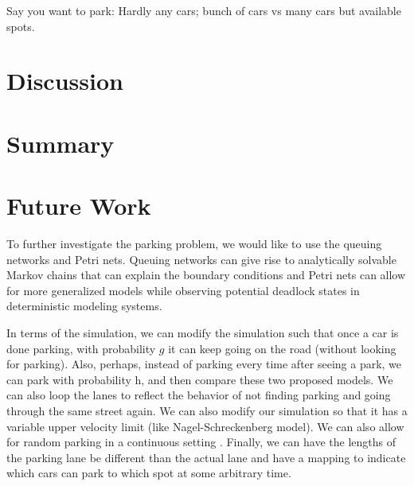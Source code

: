 \documentclass[]{article}
\begin{document}
Say you want to park: Hardly any cars; bunch of cars vs many cars but available spots.

\section*{Discussion}




\section*{Summary}



\section*{Future Work}

To further investigate the parking problem, we would like to use the queuing networks and Petri nets. Queuing networks can give rise to analytically solvable Markov chains that can explain the boundary conditions and Petri nets can allow for more generalized models while observing potential deadlock states in deterministic modeling systems. 

In terms of the simulation, we can modify the simulation such that once a car is done parking, with probability $g$ it can keep going on the road (without looking for parking). Also, perhaps, instead of parking every time after seeing a park, we can park with probability h, and then compare these two proposed models. We can also loop the lanes to reflect the behavior of not finding parking and going through the same street again. We can also modify our simulation so that it has a variable upper velocity limit (like Nagel-Schreckenberg model). We can also allow for random parking in a continuous setting \cite{randPark}. Finally, we can have the lengths of the parking lane be different than the actual lane and have a mapping to indicate which cars can park to which spot at some arbitrary time.
\end{document}
